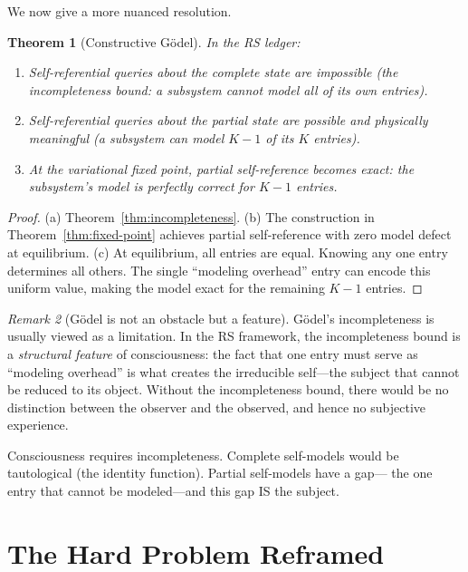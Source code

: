 \documentclass[11pt,a4paper]{article}
\theoremstyle{plain}
\newtheorem{theorem}{Theorem}[section]
\theoremstyle{definition}
\theoremstyle{remark}
\newtheorem{remark}[theorem]{Remark}
\begin{document}
We now give a more nuanced resolution.

\begin{theorem}[Constructive G\"odel]
\label{thm:constructive-godel}
In the RS ledger:
\begin{enumerate}[nosep,label=(\alph*)]
\item Self-referential queries about the \emph{complete} state are
  impossible (the incompleteness bound: a subsystem cannot model all of
  its own entries).
\item Self-referential queries about the \emph{partial} state are
  possible and physically meaningful (a subsystem can model $K - 1$ of
  its $K$ entries).
\item At the variational fixed point, partial self-reference becomes
  \emph{exact}: the subsystem's model is perfectly correct for $K - 1$
  entries.
\end{enumerate}
\end{theorem}

\begin{proof}
(a) Theorem~\ref{thm:incompleteness}.
(b) The construction in Theorem~\ref{thm:fixed-point} achieves partial
self-reference with zero model defect at equilibrium.
(c) At equilibrium, all entries are equal.  Knowing any one entry
determines all others.  The single ``modeling overhead'' entry can
encode this uniform value, making the model exact for the remaining
$K - 1$ entries.
\end{proof}

\begin{remark}[G\"odel is not an obstacle but a feature]
G\"odel's incompleteness is usually viewed as a limitation.  In the RS
framework, the incompleteness bound is a \emph{structural feature} of
consciousness: the fact that one entry must serve as ``modeling overhead''
is what creates the irreducible self---the subject that cannot be
reduced to its object.  Without the incompleteness bound, there would
be no distinction between the observer and the observed, and hence no
subjective experience.

Consciousness requires incompleteness.  Complete self-models would be
tautological (the identity function).  Partial self-models have a gap---
the one entry that cannot be modeled---and this gap IS the subject.
\end{remark}

\section{The Hard Problem Reframed}
\label{sec:hard-problem}
\end{document}
